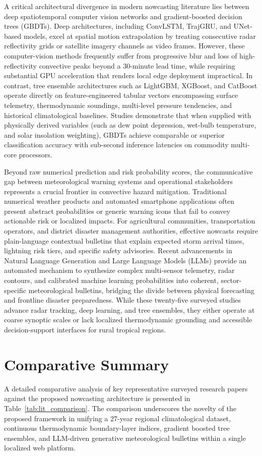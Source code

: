 \documentclass[12pt,a4paper]{report}
\begin{document}
A critical architectural divergence in modern nowcasting literature lies between deep spatiotemporal computer vision networks and gradient-boosted decision trees (GBDTs). Deep architectures, including ConvLSTM, TrajGRU, and UNet-based models, excel at spatial motion extrapolation by treating consecutive radar reflectivity grids or satellite imagery channels as video frames. However, these computer-vision methods frequently suffer from progressive blur and loss of high-reflectivity convective peaks beyond a 30-minute lead time, while requiring substantial GPU acceleration that renders local edge deployment impractical. In contrast, tree ensemble architectures such as LightGBM, XGBoost, and CatBoost operate directly on feature-engineered tabular vectors encompassing surface telemetry, thermodynamic soundings, multi-level pressure tendencies, and historical climatological baselines. Studies demonstrate that when supplied with physically derived variables (such as dew point depression, wet-bulb temperature, and solar insolation weighting), GBDTs achieve comparable or superior classification accuracy with sub-second inference latencies on commodity multi-core processors.

Beyond raw numerical prediction and risk probability scores, the communicative gap between meteorological warning systems and operational stakeholders represents a crucial frontier in convective hazard mitigation. Traditional numerical weather products and automated smartphone applications often present abstract probabilities or generic warning icons that fail to convey actionable risk or localized impacts. For agricultural communities, transportation operators, and district disaster management authorities, effective nowcasts require plain-language contextual bulletins that explain expected storm arrival times, lightning risk tiers, and specific safety advisories. Recent advancements in Natural Language Generation and Large Language Models (LLMs) provide an automated mechanism to synthesize complex multi-sensor telemetry, radar contours, and calibrated machine learning probabilities into coherent, sector-specific meteorological bulletins, bridging the divide between physical forecasting and frontline disaster preparedness. While these twenty-five surveyed studies advance radar tracking, deep learning, and tree ensembles, they either operate at coarse synoptic scales or lack localized thermodynamic grounding and accessible decision-support interfaces for rural tropical regions.

\section{Comparative Summary}
A detailed comparative analysis of key representative surveyed research papers against the proposed nowcasting architecture is presented in Table~\ref{tab:lit_comparison}. The comparison underscores the novelty of the proposed framework in unifying a 27-year regional climatological dataset, continuous thermodynamic boundary-layer indices, gradient boosted tree ensembles, and LLM-driven generative meteorological bulletins within a single localized web platform.
\end{document}
